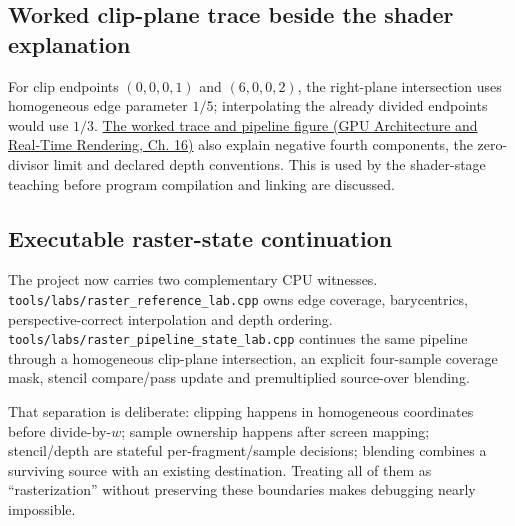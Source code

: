 \subsection{Worked clip-plane trace beside the shader explanation}\label{appendix-40426e4b2103-worked-clip-plane-trace-beside-the-shader-explanation}

\hypertarget{appendix-40426e4b2103-worked-clip-plane-trace-beside-the-shader-explanation}{}

For clip endpoints \((0,0,0,1)\) and \((6,0,0,2)\), the right-plane intersection uses homogeneous edge parameter \(1/5\); interpolating the already divided endpoints would use \(1/3\). \href{../06-GPU-Architecture-and-Real-Time-Rendering/main.pdf\#nameddest=06-engine-ii-ch025-clip-coordinates-are-not-normalized-device-coordinates}{The worked trace and pipeline figure (GPU Architecture and Real-Time Rendering, Ch. 16)} also explain negative fourth components, the zero-divisor limit and declared depth conventions. This is used by the shader-stage teaching before program compilation and linking are discussed.

\subsection{Executable raster-state continuation}\label{appendix-40426e4b2103-executable-raster-state-continuation}

\hypertarget{appendix-40426e4b2103-executable-raster-state-continuation}{}

The project now carries two complementary CPU witnesses. \texttt{tools/labs/raster\_reference\_lab.cpp} owns edge coverage, barycentrics, perspective-correct interpolation and depth ordering. \texttt{tools/labs/raster\_pipeline\_state\_lab.cpp} continues the same pipeline through a homogeneous clip-plane intersection, an explicit four-sample coverage mask, stencil compare/pass update and premultiplied source-over blending.

That separation is deliberate: clipping happens in homogeneous coordinates before divide-by-\(w\); sample ownership happens after screen mapping; stencil/depth are stateful per-fragment/sample decisions; blending combines a surviving source with an existing destination. Treating all of them as ``rasterization'' without preserving these boundaries makes debugging nearly impossible.
